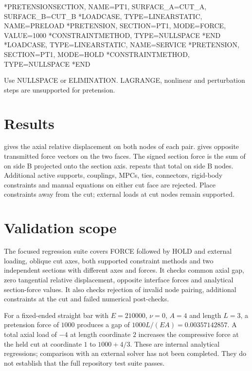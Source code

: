 \begin{femasterdeck}
*PRETENSIONSECTION, NAME=PT1, SURFACE_A=CUT_A, SURFACE_B=CUT_B
*LOADCASE, TYPE=LINEARSTATIC, NAME=PRELOAD
*PRETENSION, SECTION=PT1, MODE=FORCE, VALUE=1000
*CONSTRAINTMETHOD, TYPE=NULLSPACE
*END
*LOADCASE, TYPE=LINEARSTATIC, NAME=SERVICE
*PRETENSION, SECTION=PT1, MODE=HOLD
*CONSTRAINTMETHOD, TYPE=NULLSPACE
*END
\end{femasterdeck}

Use NULLSPACE or ELIMINATION. LAGRANGE, nonlinear and perturbation steps are
unsupported for pretension.

\section{Results}

 gives the axial relative displacement on both nodes of each pair.
 gives opposite transmitted force vectors on the two faces.
The signed section force is the sum of  on side B projected onto
the section axis.  repeats that total on side B nodes. Additional active supports, couplings, MPCs, ties, connectors, rigid-body constraints
and manual equations on either cut face are rejected. Place constraints away from the cut;
external loads at cut nodes remain supported.

\section{Validation scope}

The focused regression suite covers FORCE followed by HOLD and external loading,
oblique cut axes, both supported constraint methods and two independent sections
with different axes and forces. It checks common axial gap, zero tangential
relative displacement, opposite interface forces and analytical section-force
values. It also checks rejection of invalid node pairing, additional constraints
at the cut and failed numerical post-checks.

For a fixed-ended straight bar with $E=210000$, $\nu=0$, $A=4$ and length $L=3$,
a pretension force of $1000$ produces a gap of $1000L/(EA)=0.00357142857$.
A total axial load of $-4$ at length coordinate $2$ increases the compressive
force at the held cut at coordinate $1$ to $1000+4/3$.
These are internal analytical regressions; comparison with an external solver
has not been completed. They do not establish that the full repository test
suite passes.
